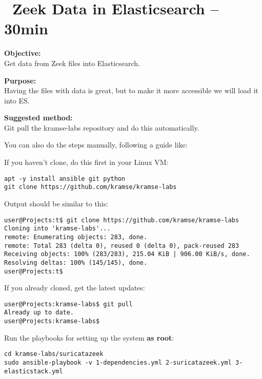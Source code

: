 \documentclass[a4paper,11pt,notitlepage]{report}
\begin{document}
\chapter{\faExclamationTriangle\ Zeek Data in Elasticsearch -- 30min}
\label{ex:zeek-json-es}

{\bf Objective:}\\
Get data from Zeek files into Elasticsearch.


{\bf Purpose:}\\
Having the files with data is great, but to make it more accessible we will load it into ES.


{\bf Suggested method:}\\
Git pull the kramse-labs repository and do this automatically.

You can also do the steps manually, following a guide like:\\


If you haven't clone, do this first in your Linux VM:
\begin{verbatim}
apt -y install ansible git python
git clone https://github.com/kramse/kramse-labs
\end{verbatim}

Output should be similar to this:
\begin{verbatim}
user@Projects:t$ git clone https://github.com/kramse/kramse-labs
Cloning into 'kramse-labs'...
remote: Enumerating objects: 283, done.
remote: Total 283 (delta 0), reused 0 (delta 0), pack-reused 283
Receiving objects: 100% (283/283), 215.04 KiB | 906.00 KiB/s, done.
Resolving deltas: 100% (145/145), done.
user@Projects:t$
\end{verbatim}

If you already cloned, get the latest updates:
\begin{verbatim}
user@Projects:kramse-labs$ git pull
Already up to date.
user@Projects:kramse-labs$
\end{verbatim}

Run the playbooks for setting up the system {\bf as root}:
\begin{verbatim}
cd kramse-labs/suricatazeek
sudo ansible-playbook -v 1-dependencies.yml 2-suricatazeek.yml 3-elasticstack.yml
\end{verbatim}
\end{document}
